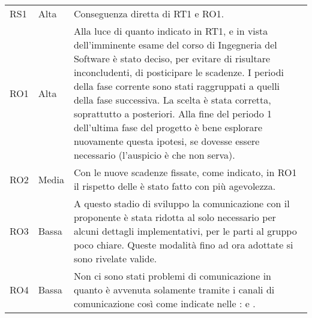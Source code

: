 {\begin{longtable}{C{2cm} C{3cm} C{10cm}}
RS1 &
Alta &
Conseguenza diretta di RT1 e RO1. \\

RO1 &
Alta &
Alla luce di quanto indicato in RT1, e in vista dell'imminente esame del corso di Ingegneria del Software è stato deciso, per evitare di risultare inconcludenti, di posticipare le scadenze. I periodi della fase corrente sono stati raggruppati a quelli della fase successiva. La scelta è stata corretta, soprattutto a posteriori. Alla fine del periodo 1 dell'ultima fase del progetto è bene esplorare nuovamente questa ipotesi, se dovesse essere necessario (l'auspicio è che non serva). \\

RO2 &
Media &
Con le nuove scadenze fissate, come indicato, in RO1 il rispetto delle  è stato fatto con più agevolezza. \\

RO3 &
Bassa &
A questo stadio di sviluppo la comunicazione con il proponente è stata ridotta al solo necessario per alcuni dettagli implementativi, per le parti al gruppo poco chiare. Queste modalità fino ad ora adottate si sono rivelate valide. \\

RO4 &
Bassa &
Non ci sono stati problemi di comunicazione in quanto è avvenuta solamente tramite i canali di comunicazione così come indicate nelle \NdP{}:  e . \\

\end{longtable}	
}
\newpage